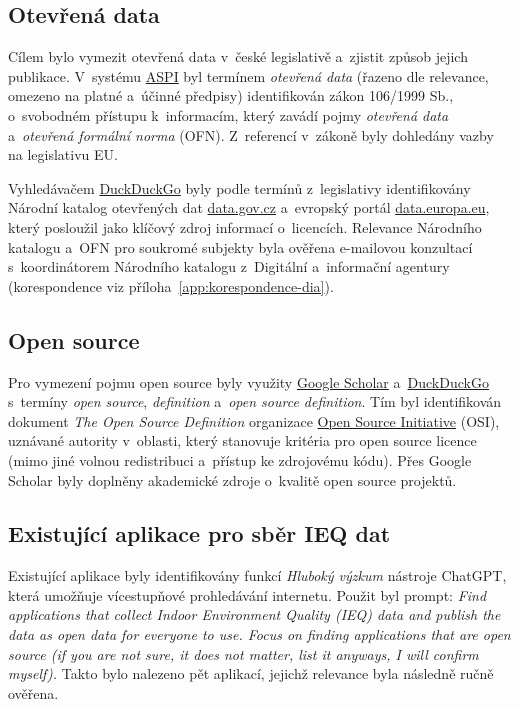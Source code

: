 \FloatBarrier
\subsection{Otevřená data}

Cílem bylo vymezit otevřená data v~české legislativě a~zjistit způsob jejich publikace. V~systému \href{https://www.aspi.cz/menu/search}{ASPI} byl termínem \textit{otevřená data} (řazeno dle relevance, omezeno na platné a~účinné předpisy) identifikován zákon 106/1999 Sb., o~svobodném přístupu k~informacím, který zavádí pojmy \textit{otevřená data} a~\textit{otevřená formální norma} (OFN). Z~referencí v~zákoně byly dohledány vazby na legislativu EU.

Vyhledávačem \href{https://duckduckgo.com/}{DuckDuckGo} byly podle termínů z~legislativy identifikovány Národní katalog otevřených dat \href{https://data.gov.cz/}{data.gov.cz} a~evropský portál \href{https://data.europa.eu/}{data.europa.eu}, který posloužil jako klíčový zdroj informací o~licencích. Relevance Národního katalogu a~OFN pro soukromé subjekty byla ověřena e-mailovou konzultací s~koordinátorem Národního katalogu z~Digitální a~informační agentury (korespondence viz příloha~\ref{app:korespondence-dia}).

\FloatBarrier
\subsection{Open source}

Pro vymezení pojmu open source byly využity \href{https://scholar.google.cz/}{Google Scholar} a~\href{https://duckduckgo.com/}{DuckDuckGo} s~termíny \textit{open source}, \textit{definition} a~\textit{open source definition}. Tím byl identifikován dokument \emph{The Open Source Definition} organizace \href{https://opensource.org/}{Open Source Initiative} (OSI), uznávané autority v~oblasti, který stanovuje kritéria pro open source licence (mimo jiné volnou redistribuci a~přístup ke zdrojovému kódu). Přes Google Scholar byly doplněny akademické zdroje o~kvalitě open source projektů.

\FloatBarrier
\subsection{Existující aplikace pro sběr IEQ dat}

Existující aplikace byly identifikovány funkcí \emph{Hluboký výzkum} nástroje ChatGPT, která umožňuje vícestupňové prohledávání internetu. Použit byl prompt: \textit{Find applications that collect Indoor Environment Quality (IEQ) data and publish the data as open data for everyone to use. Focus on finding applications that are open source (if you are not sure, it does not matter, list it anyways, I will confirm myself).} Takto bylo nalezeno pět aplikací, jejichž relevance byla následně ručně ověřena.

